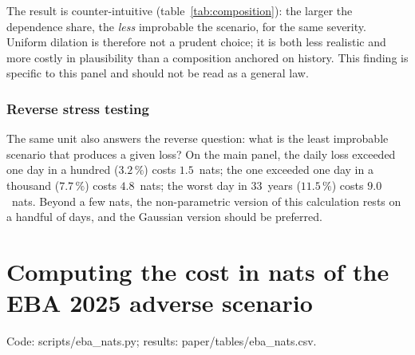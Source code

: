 \documentclass[11pt]{article}
\theoremstyle{definition}
\begin{document}
The result is counter-intuitive (table~\ref{tab:composition}): the larger the
dependence share, the \emph{less} improbable the scenario, for the same
severity. Uniform dilation is therefore not a prudent choice; it is both less
realistic and more costly in plausibility than a composition anchored on
history. This finding is specific to this panel and should not be read as a
general law.

\subsubsection{Reverse stress testing}

The same unit also answers the reverse question: what is the least improbable
scenario that produces a given loss? On the main panel, the daily loss
exceeded one day in a hundred ($3.2\,\%$) costs $1.5$~nats; the one exceeded
one day in a thousand ($7.7\,\%$) costs $4.8$~nats; the worst day in 33~years
($11.5\,\%$) costs $9.0$~nats. Beyond a few nats, the non-parametric version
of this calculation rests on a handful of days, and the Gaussian version
should be preferred.


\section{Computing the cost in nats of the EBA 2025 adverse scenario}
\label{oa:eba}

Code: scripts/eba\_nats.py; results: paper/tables/eba\_nats.csv.
\end{document}
